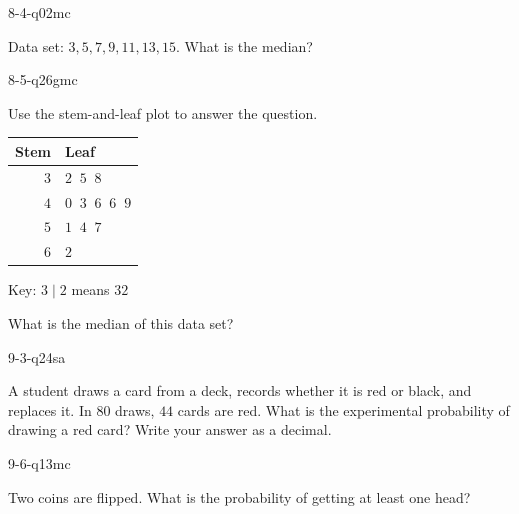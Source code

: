 \begin{practiceQuestion}{8-4-q02}{mc}
\begin{questionText}
Data set: $3, 5, 7, 9, 11, 13, 15$. What is the median?
\end{questionText}
\end{practiceQuestion}

\begin{practiceQuestion}{8-5-q26}{gmc}
\begin{questionText}
Use the stem-and-leaf plot to answer the question.

\begin{center}
\begin{tabular}{r|l}
\textbf{Stem} & \textbf{Leaf} \\
\hline
$3$ & $2\;\;5\;\;8$ \\
$4$ & $0\;\;3\;\;6\;\;6\;\;9$ \\
$5$ & $1\;\;4\;\;7$ \\
$6$ & $2$
\end{tabular}

Key: $3 \mid 2$ means $32$
\end{center}

What is the median of this data set?
\end{questionText}
\end{practiceQuestion}

\begin{practiceQuestion}{9-3-q24}{sa}
\begin{questionText}
A student draws a card from a deck, records whether it is red or black, and replaces it. In $80$ draws, $44$ cards are red. What is the experimental probability of drawing a red card? Write your answer as a decimal.
\end{questionText}
\end{practiceQuestion}

\begin{practiceQuestion}{9-6-q13}{mc}
\begin{questionText}
Two coins are flipped. What is the probability of getting at least one head?
\end{questionText}
\end{practiceQuestion}


